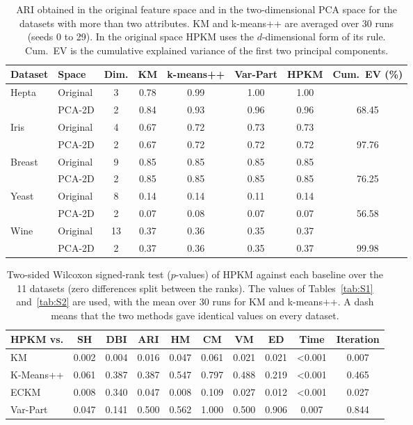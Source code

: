 \begin{table}[htbp]
\centering
\caption{ARI obtained in the original feature space and in the two-dimensional PCA space for the datasets with more than two attributes. KM and k-means++ are averaged over 30 runs (seeds 0 to 29). In the original space HPKM uses the $d$-dimensional form of its rule. Cum.\ EV is the cumulative explained variance of the first two principal components.}
\label{tab:S4}
\small
\begin{tabular}{|l|l|c|cccc|c|}
\hline
Dataset & Space & Dim. & KM & k-means++ & Var-Part & HPKM & Cum.\ EV (\%) \\
\hline
Hepta & Original & 3 & 0.78 & 0.99 & 1.00 & 1.00 &  \\
 & PCA-2D & 2 & 0.84 & 0.93 & 0.96 & 0.96 & 68.45 \\
\hline
Iris & Original & 4 & 0.67 & 0.72 & 0.73 & 0.73 &  \\
 & PCA-2D & 2 & 0.67 & 0.72 & 0.72 & 0.72 & 97.76 \\
\hline
Breast & Original & 9 & 0.85 & 0.85 & 0.85 & 0.85 &  \\
 & PCA-2D & 2 & 0.85 & 0.85 & 0.85 & 0.85 & 76.25 \\
\hline
Yeast & Original & 8 & 0.14 & 0.14 & 0.11 & 0.14 &  \\
 & PCA-2D & 2 & 0.07 & 0.08 & 0.07 & 0.07 & 56.58 \\
\hline
Wine & Original & 13 & 0.37 & 0.36 & 0.35 & 0.37 &  \\
 & PCA-2D & 2 & 0.37 & 0.36 & 0.35 & 0.37 & 99.98 \\
\hline
\end{tabular}
\end{table}

\begin{table}[htbp]
\centering
\caption{Two-sided Wilcoxon signed-rank test ($p$-values) of HPKM against each baseline over the 11 datasets (zero differences split between the ranks). The values of Tables~\ref{tab:S1} and~\ref{tab:S2} are used, with the mean over 30 runs for KM and k-means++. A dash means that the two methods gave identical values on every dataset.}
\label{tab:S5}
\small
\begin{tabular}{|l|ccccccccc|}
\hline
HPKM vs. & SH & DBI & ARI & HM & CM & VM & ED & Time & Iteration \\
\hline
KM & 0.002 & 0.004 & 0.016 & 0.047 & 0.061 & 0.021 & 0.021 & <0.001 & 0.007 \\
K-Means++ & 0.061 & 0.387 & 0.387 & 0.547 & 0.797 & 0.488 & 0.219 & <0.001 & 0.465 \\
ECKM & 0.008 & 0.340 & 0.047 & 0.008 & 0.109 & 0.027 & 0.012 & <0.001 & 0.027 \\
Var-Part & 0.047 & 0.141 & 0.500 & 0.562 & 1.000 & 0.500 & 0.906 & 0.007 & 0.844 \\
\hline
\end{tabular}
\end{table}

